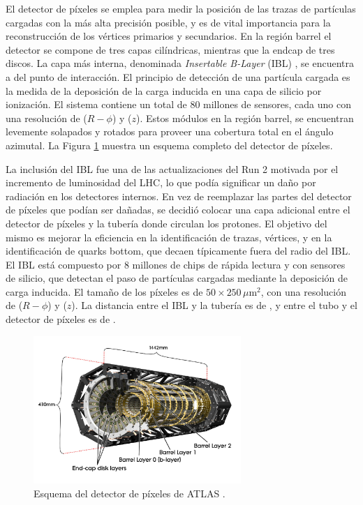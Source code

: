 El detector de píxeles se emplea para medir la posición de las trazas de partículas cargadas con la más alta precisión posible, y es de vital importancia para la reconstrucción de los vértices primarios y secundarios. En la región barrel el detector se compone de tres capas cilíndricas, mientras que la endcap de tres discos. La capa más interna, denominada \textit{Insertable B-Layer} (IBL) \cite{ATLAS-TDR-2010-19}, se encuentra a  del punto de interacción.
El principio de detección de una partícula cargada es la medida de la deposición de la carga inducida en una capa de silicio por ionización. El sistema contiene un total de $80$ millones de sensores, cada uno con una resolución de  ($R-\phi$) y  ($z$). Estos módulos en la región barrel, se encuentran levemente solapados y rotados para proveer una cobertura total en el ángulo azimutal. La Figura \ref{fig:pixel_3} muestra un esquema completo del detector de píxeles.

La inclusión del IBL fue una de las actualizaciones del Run 2 motivada por el incremento de luminosidad del LHC, lo que podía significar un daño por radiación en los detectores internos. En vez de reemplazar las partes del detector de píxeles que podían ser dañadas, se decidió colocar una capa adicional entre el detector de píxeles y la tubería donde circulan los protones. El objetivo del mismo es mejorar la eficiencia en la identificación de trazas, vértices, y en la identificación de quarks bottom, que decaen típicamente fuera del radio del IBL. El IBL está compuesto por $8$ millones de chips de rápida lectura y con sensores de silicio, que detectan el paso de partículas cargadas mediante la deposición de carga inducida. El tamaño de los píxeles es de $50\times250\,\mu$m$^{2}$, con una resolución de  ($R-\phi$) y  ($z$). La distancia entre el IBL y la tubería es de , y entre el tubo y el detector de píxeles es de . 


\begin{figure}
  \centering
  \includegraphics[width=0.7\textwidth]{images/lhc/pixel_3.png}
  \caption{Esquema del detector de píxeles de ATLAS \cite{Takubo:1957197}.}
  \label{fig:pixel_3}
\end{figure}

